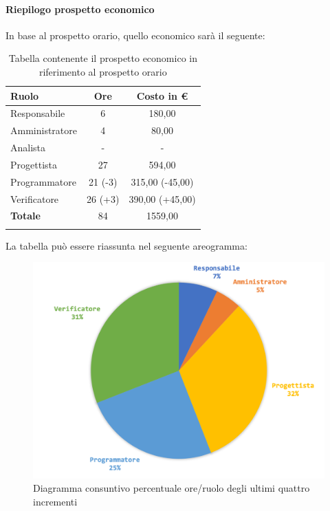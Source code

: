 		
		\paragraph{Riepilogo prospetto economico}
			In base al prospetto orario, quello economico sarà il seguente: 
			
			\begin{longtable}{|l|c|c|}
				\hline
				\rowcolor{lighter-grayer}
				\textbf{Ruolo} & \textbf{Ore} & \textbf{Costo in € } \\
				\hline
				\endfirsthead
				
				\hline
				Responsabile 	    & 6 & 180,00\\
				\hline 
				\hline
				Amministratore	   & 4 & 80,00\\
				\hline
				\hline
				Analista 				& - & -\\
				\hline
				\hline
				Progettista 		   & 27 & 594,00\\
				\hline
				\hline
				Programmatore 	  & 21 (-3)  & 315,00 (-45,00)\\
				\hline
				\hline
				Verificatore 		   & 26 (+3) & 390,00 (+45,00)\\
				\hline
				\textbf{Totale} 	 & 84 & 1559,00\\
				\hline
				\caption{Tabella contenente il prospetto economico in riferimento al prospetto orario}
			\end{longtable}
				\pagebreak
			
			La tabella può essere riassunta nel seguente areogramma:
			\begin{figure}[H]
				\centering
				\includegraphics[width=0.8\linewidth]{./images/consuntivo/ConsIncr9-12-2.png}
				\caption{Diagramma consuntivo percentuale ore/ruolo degli ultimi quattro incrementi}
				\label{ fig:diagramma consuntivo costi ruolo incrementi IX-XI I}
			\end{figure}
